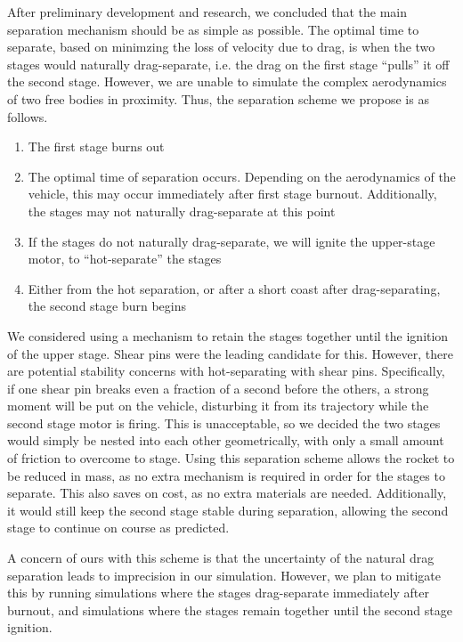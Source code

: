 After preliminary development and research, we concluded that the main separation mechanism should be as simple as possible. The optimal time to separate, based on minimzing the loss of velocity due to drag, is when the two stages would naturally drag-separate, i.e. the drag on the first stage ``pulls'' it off the second stage. However, we are unable to simulate the complex aerodynamics of two free bodies in proximity. Thus, the separation scheme we propose is as follows.

\begin{enumerate} %
    \item The first stage burns out
    \item The optimal time of separation occurs. Depending on the aerodynamics of the vehicle, this may occur immediately after first stage burnout. Additionally, the stages may not naturally drag-separate at this point
    \item If the stages do not naturally drag-separate, we will ignite the upper-stage motor, to ``hot-separate'' the stages
    \item Either from the hot separation, or after a short coast after drag-separating, the second stage burn begins
\end{enumerate}

We considered using a mechanism to retain the stages together until the ignition of the upper stage. Shear pins were the leading candidate for this. However, there are potential stability concerns with hot-separating with shear pins. Specifically, if one shear pin breaks even a fraction of a second before the others, a strong moment will be put on the vehicle, disturbing it from its trajectory while the second stage motor is firing. This is unacceptable, so we decided the two stages would simply be nested into each other geometrically, with only a small amount of friction to overcome to stage. Using this separation scheme allows the rocket to be reduced in mass, as no extra mechanism is required in order for the stages to separate. This also saves on cost, as no extra materials are needed. Additionally, it would still keep the second stage stable during separation, allowing the second stage to continue on course as predicted. 

A concern of ours with this scheme is that the uncertainty of the natural drag separation leads to imprecision in our simulation. However, we plan to mitigate this by running simulations where the stages drag-separate immediately after burnout, and simulations where the stages remain together until the second stage ignition.


